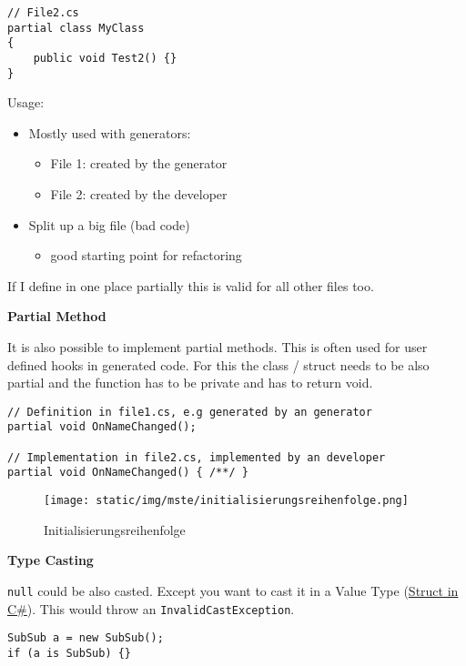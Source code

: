 \documentclass[11pt,twoside,landscape]{article}
\begin{document}
\begin{multicols}{3}
\begin{lstlisting}
// File2.cs
partial class MyClass
{
    public void Test2() {}
}
\end{lstlisting}

Usage:
\begin{itemize}
\item Mostly used with generators:
\begin{itemize}
\item File 1: created by the generator
\item File 2: created by the developer
\end{itemize}
\item Split up a big file (bad code)
\begin{itemize}
\item good starting point for refactoring
\end{itemize}
\end{itemize}


If I define in one place partially this is valid for all other files too.

\textbf{Partial Method}

It is also possible to implement partial methods.
This is often used for user defined hooks in generated code.
For this the class / struct needs to be also partial and the function has to be private and has to return void.

\lstset{language=csharp,label= ,caption= ,captionpos=b,numbers=none}
\begin{lstlisting}
// Definition in file1.cs, e.g generated by an generator
partial void OnNameChanged();

// Implementation in file2.cs, implemented by an developer
partial void OnNameChanged() { /**/ }
\end{lstlisting}


\begin{figure}[htbp]
\centering
\texttt{[image: static/img/mste/initialisierungsreihenfolge.png]}
\caption{\label{fig:org51b4c57}Initialisierungsreihenfolge}
\end{figure}

\textbf{Type Casting}

\texttt{null} could be also casted.
Except you want to cast it in a Value Type (\href{../../../roam/20211008085202-struct_in_c.org}{Struct in C\#}).
This would throw an \texttt{InvalidCastException}.
\lstset{language=csharp,label= ,caption= ,captionpos=b,numbers=none}
\begin{lstlisting}
SubSub a = new SubSub();
if (a is SubSub) {}
\end{lstlisting}


\end{multicols}
\end{document}
